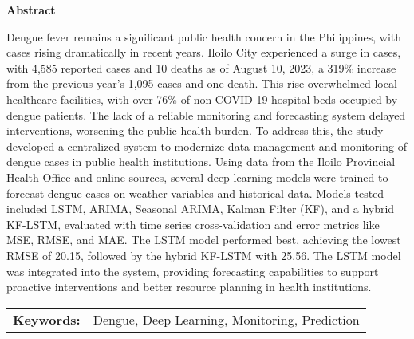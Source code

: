 
\begin{center}
	\textbf{Abstract}
\end{center}

{\small
	\begin{spacing}{1.5}  %
		Dengue fever remains a significant public health concern in the Philippines, with cases rising dramatically in recent years. Iloilo City experienced a surge in cases, with 4,585 reported cases and 10 deaths as of August 10, 2023, a 319\% increase from the previous year’s 1,095 cases and one death. This rise overwhelmed local healthcare facilities, with over 76\% of non-COVID-19 hospital beds occupied by dengue patients. The lack of a reliable monitoring and forecasting system delayed interventions, worsening the public health burden. To address this, the study developed a centralized system to modernize data management and monitoring of dengue cases in public health institutions. Using data from the Iloilo Provincial Health Office and online sources, several deep learning models were trained to forecast dengue cases on weather variables and historical data. Models tested included LSTM, ARIMA, Seasonal ARIMA, Kalman Filter (KF), and a hybrid KF-LSTM, evaluated with time series cross-validation and error metrics like MSE, RMSE, and MAE. The LSTM model performed best, achieving the lowest RMSE of 20.15, followed by the hybrid KF-LSTM with 25.56. The LSTM model was integrated into the system, providing forecasting capabilities to support proactive interventions and better resource planning in health institutions.
	\end{spacing}
}

\vspace{0.5em}
\begin{tabular}{lp{4.25in}}
	\hspace{-0.5em}\textbf{Keywords:}\hspace{0.25em} & Dengue, Deep Learning, Monitoring, Prediction \\
\end{tabular}

